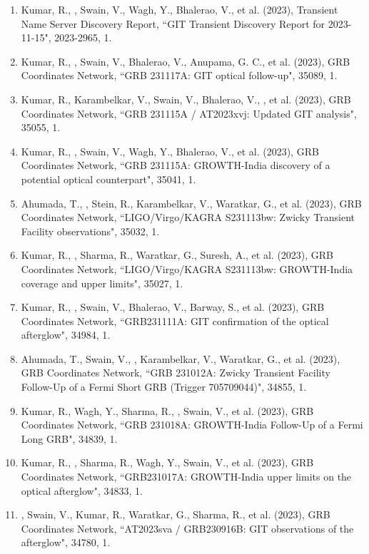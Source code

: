 \begin{enumerate}[leftmargin=*]
\item Kumar, R., \me, Swain, V., Wagh, Y., Bhalerao, V., et al. (2023), Transient Name Server Discovery Report, {``GIT Transient Discovery Report for 2023-11-15"}, 2023-2965, 1.

\item Kumar, R., \me, Swain, V., Bhalerao, V., Anupama, G. C., et al. (2023), GRB Coordinates Network, {``GRB 231117A: GIT optical follow-up"}, 35089, 1.

\item Kumar, R., Karambelkar, V., Swain, V., Bhalerao, V., \me, et al. (2023), GRB Coordinates Network, {``GRB 231115A / AT2023xvj: Updated GIT analysis"}, 35055, 1.

\item Kumar, R., \me, Swain, V., Wagh, Y., Bhalerao, V., et al. (2023), GRB Coordinates Network, {``GRB 231115A: GROWTH-India discovery of a potential optical counterpart"}, 35041, 1.

\item Ahumada, T., \me, Stein, R., Karambelkar, V., Waratkar, G., et al. (2023), GRB Coordinates Network, {``LIGO/Virgo/KAGRA S231113bw: Zwicky Transient Facility observations"}, 35032, 1.

\item Kumar, R., \me, Sharma, R., Waratkar, G., Suresh, A., et al. (2023), GRB Coordinates Network, {``LIGO/Virgo/KAGRA S231113bw: GROWTH-India coverage and upper limits"}, 35027, 1.

\item Kumar, R., \me, Swain, V., Bhalerao, V., Barway, S., et al. (2023), GRB Coordinates Network, {``GRB231111A: GIT confirmation of the optical afterglow"}, 34984, 1.

\item Ahumada, T., Swain, V., \me, Karambelkar, V., Waratkar, G., et al. (2023), GRB Coordinates Network, {``GRB 231012A: Zwicky Transient Facility Follow-Up of a Fermi Short GRB (Trigger 705709044)"}, 34855, 1.

\item Kumar, R., Wagh, Y., Sharma, R., \me, Swain, V., et al. (2023), GRB Coordinates Network, {``GRB 231018A: GROWTH-India Follow-Up of a Fermi Long GRB"}, 34839, 1.

\item Kumar, R., \me, Sharma, R., Wagh, Y., Swain, V., et al. (2023), GRB Coordinates Network, {``GRB231017A: GROWTH-India upper limits on the optical afterglow"}, 34833, 1.

\item \me, Swain, V., Kumar, R., Waratkar, G., Sharma, R., et al. (2023), GRB Coordinates Network, {``AT2023sva / GRB230916B: GIT observations of the afterglow"}, 34780, 1.


\end{enumerate}
